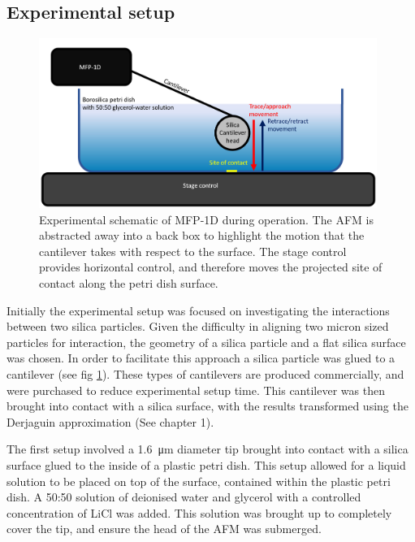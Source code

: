 \subsection{Experimental setup}

\begin{figure}[h!]     %
        \begin{center}
          \includegraphics[width=110mm]{chapter4/Chapter4ExperiSetup2.PNG}
\end{center}
\caption{Experimental schematic of MFP-1D during operation. The AFM is abstracted away into a back box to highlight the motion that the cantilever takes with respect to the surface. The stage control provides horizontal control, and therefore moves the projected site of contact along the petri dish surface.} 
\label{fig:Chapter4ExperiSetup}                 %
\end{figure}


Initially the experimental setup was focused on investigating the interactions between two silica particles. Given the difficulty in aligning two micron sized particles for interaction, the geometry of a silica particle and a flat silica surface was chosen. In order to facilitate this approach a silica particle was glued to a cantilever (see fig \ref{fig:Chapter4ExperiSetup}). These types of cantilevers are produced commercially, and were purchased to reduce experimental setup time. This cantilever was then brought into contact with a silica surface, with the results transformed using the Derjaguin approximation (See chapter 1). 

The first setup involved a \SI{1.6}{\micro\metre} diameter tip brought into contact with a silica surface glued to the  inside of a plastic petri dish. This setup allowed for a liquid solution to be placed on top of the surface, contained within the plastic petri dish. A 50:50 solution of deionised water and glycerol with a controlled concentration of LiCl was added. This solution was brought up to completely cover the tip, and ensure the head of the AFM was submerged.

